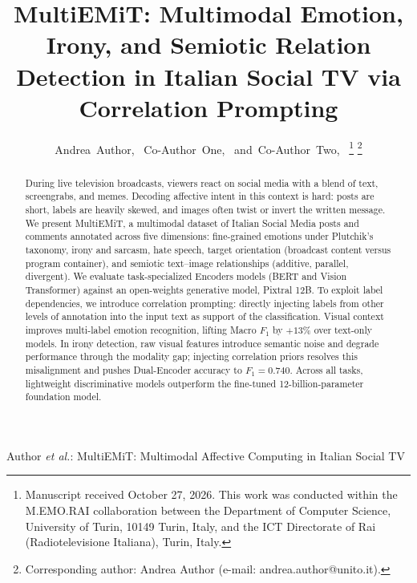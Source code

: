 \documentclass[letterpaper,journal]{IEEEtran}
\begin{document}
\title{MultiEMiT: Multimodal Emotion, Irony, and Semiotic Relation Detection in Italian Social TV via Correlation Prompting}

\author{Andrea~Author,~
        Co-Author~One,~
        and~Co-Author~Two,~%
\thanks{Manuscript received October 27, 2026. This work was conducted within the M.EMO.RAI collaboration between the Department of Computer Science, University of Turin, 10149 Turin, Italy, and the ICT Directorate of Rai (Radiotelevisione Italiana), Turin, Italy.}%
\thanks{Corresponding author: Andrea Author (e-mail: andrea.author@unito.it).}}

%
{Author \MakeLowercase{\textit{et al.}}: MultiEMiT: Multimodal Affective Computing in Italian Social TV}

\maketitle

\begin{abstract}
During live television broadcasts, viewers react on social media with a blend of text, screengrabs, and memes. Decoding affective intent in this context is hard: posts are short, labels are heavily skewed, and images often twist or invert the written message. We present MultiEMiT, a multimodal dataset of Italian Social Media posts and comments annotated across five dimensions: fine-grained emotions under Plutchik's taxonomy, irony and sarcasm, hate speech, target orientation (broadcast content versus program container), and semiotic text--image relationships (additive, parallel, divergent). We evaluate task-specialized Encoders models (BERT and Vision Transformer) against an open-weights generative model, Pixtral 12B.  To exploit label dependencies, we introduce correlation prompting: directly injecting labels from other levels of annotation into the input text as support of the classification. Visual context improves multi-label emotion recognition, lifting Macro $F_1$ by $+13$\% over text-only models. In irony detection, raw visual features introduce semantic noise and degrade performance through the modality gap; injecting correlation priors resolves this misalignment and pushes Dual-Encoder accuracy to $F_1 = 0.740$. Across all tasks, lightweight discriminative models outperform the fine-tuned 12-billion-parameter foundation model.
\end{abstract}
\end{document}
